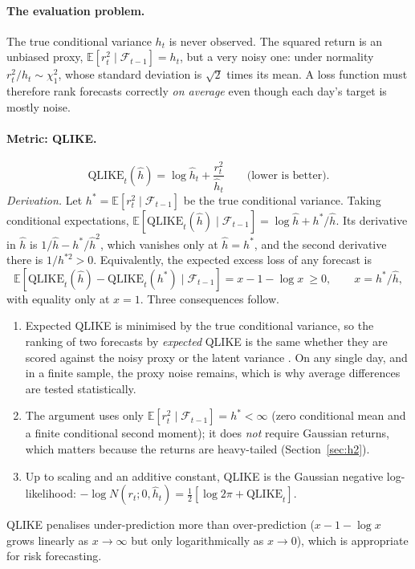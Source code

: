 \documentclass[11pt]{article}
\newcommand{\E}{\mathbb{E}}
\begin{document}
\paragraph{The evaluation problem.} The true conditional variance $h_t$ is never observed. The squared return is an
unbiased proxy, $\E[r_t^2\mid\mathcal F_{t-1}]=h_t$, but a very noisy one: under normality $r_t^2/h_t\sim\chi^2_1$,
whose standard deviation is $\sqrt2$ times its mean. A loss function must therefore rank forecasts correctly
\emph{on average} even though each day's target is mostly noise.

\paragraph{Metric: QLIKE.}
\begin{equation}\label{eq:qlike}
\text{QLIKE}_t(\hat h)=\log\hat h_t+\frac{r_t^2}{\hat h_t}\qquad\text{(lower is better).}
\end{equation}
\textit{Derivation.} Let $h^*=\E[r_t^2\mid\mathcal F_{t-1}]$ be the true conditional variance. Taking conditional
expectations, $\E[\text{QLIKE}_t(\hat h)\mid\mathcal F_{t-1}]=\log\hat h+h^*/\hat h$. Its derivative in $\hat h$ is
$1/\hat h-h^*/\hat h^2$, which vanishes only at $\hat h=h^*$, and the second derivative there is $1/h^{*2}>0$.
Equivalently, the expected excess loss of any forecast is
\[
\E[\text{QLIKE}_t(\hat h)-\text{QLIKE}_t(h^*)\mid\mathcal F_{t-1}]=x-1-\log x\ \ge0,\qquad x=h^*/\hat h,
\]
with equality only at $x=1$. Three consequences follow.
\begin{enumerate}
\item Expected QLIKE is minimised by the true conditional variance, so the ranking of two forecasts by \emph{expected}
QLIKE is the same whether they are scored against the noisy proxy or the latent variance \cite{patton2011}. On any
single day, and in a finite sample, the proxy noise remains, which is why average differences are tested statistically.
\item The argument uses only $\E[r_t^2\mid\mathcal F_{t-1}]=h^*<\infty$ (zero conditional mean and a finite conditional
second moment); it does \emph{not} require Gaussian returns, which
matters because the returns are heavy-tailed (Section~\ref{sec:h2}).
\item Up to scaling and an additive constant, QLIKE is the Gaussian negative log-likelihood:
$-\log N(r_t;0,\hat h_t)=\tfrac12[\log2\pi+\text{QLIKE}_t]$.
\end{enumerate}
QLIKE penalises under-prediction more than over-prediction ($x-1-\log x$ grows linearly as $x\to\infty$ but only
logarithmically as $x\to0$), which is appropriate for risk forecasting.
\end{document}

